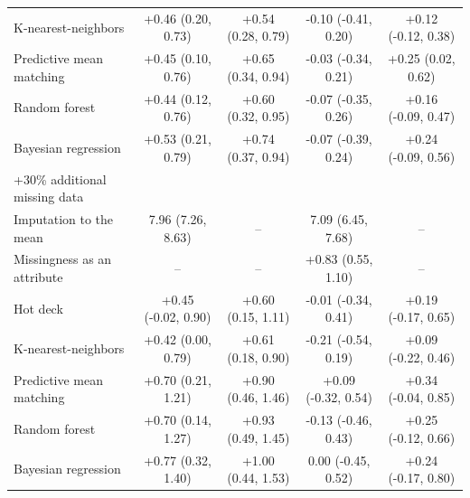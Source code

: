 \documentclass{article}
\begin{document}
\begin{table}
\begin{tabular}{lcccc}
K-nearest-neighbors & +0.46 (0.20, 0.73) & +0.54 (0.28, 0.79) & -0.10 (-0.41, 0.20) & +0.12 (-0.12, 0.38) \\ 
Predictive mean matching & +0.45 (0.10, 0.76) & +0.65 (0.34, 0.94) & -0.03 (-0.34, 0.21) & +0.25 (0.02, 0.62) \\ 
Random forest & +0.44 (0.12, 0.76) & +0.60 (0.32, 0.95) & -0.07 (-0.35, 0.26) & +0.16 (-0.09, 0.47) \\ 
Bayesian regression & +0.53 (0.21, 0.79) & +0.74 (0.37, 0.94) & -0.07 (-0.39, 0.24) & +0.24 (-0.09, 0.56) \\ 
\midrule
\multicolumn{1}{l}{+30\% additional missing data} \\ 
\midrule
Imputation to the mean & 7.96 (7.26, 8.63) & -- & 7.09 (6.45, 7.68) & -- \\ 
Missingness as an attribute & -- & -- & +0.83 (0.55, 1.10) & -- \\ 
Hot deck & +0.45 (-0.02, 0.90) & +0.60 (0.15, 1.11) & -0.01 (-0.34, 0.41) & +0.19 (-0.17, 0.65) \\ 
K-nearest-neighbors & +0.42 (0.00, 0.79) & +0.61 (0.18, 0.90) & -0.21 (-0.54, 0.19) & +0.09 (-0.22, 0.46) \\ 
Predictive mean matching & +0.70 (0.21, 1.21) & +0.90 (0.46, 1.46) & +0.09 (-0.32, 0.54) & +0.34 (-0.04, 0.85) \\ 
Random forest & +0.70 (0.14, 1.27) & +0.93 (0.49, 1.45) & -0.13 (-0.46, 0.43) & +0.25 (-0.12, 0.66) \\ 
Bayesian regression & +0.77 (0.32, 1.40) & +1.00 (0.44, 1.53) & 0.00 (-0.45, 0.52) & +0.24 (-0.17, 0.80) \\ 
\bottomrule
\end{tabular} 
 \end{table}

\clearpage
\end{document}
